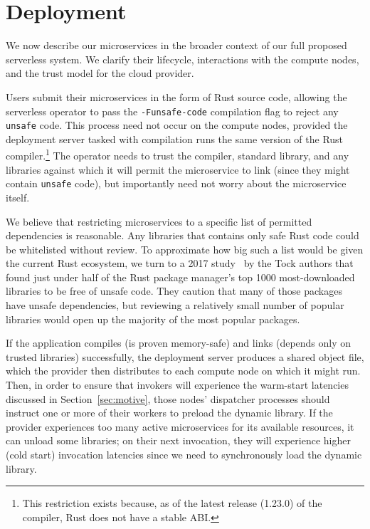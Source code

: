 \section{Deployment}
\label{sec:deploy}

We now describe our microservices in the broader context of our full proposed
serverless system.  We clarify their lifecycle, interactions with the compute nodes,
and the trust model for the cloud provider.

Users submit their microservices in the form of Rust source code, allowing the
serverless operator to pass the \texttt{-Funsafe-code} compilation flag to reject
any \texttt{unsafe} code.  This process need not occur on the compute
nodes, provided the deployment server tasked with compilation runs the same version
of the Rust compiler.\footnote{This restriction exists because, as of the latest
release (1.23.0) of the compiler, Rust does not have a stable ABI.}  The operator
needs to trust the compiler, standard library, and any libraries against which it
will permit the microservice to link (since they might contain \texttt{unsafe} code),
but importantly need not worry about the microservice itself.

We believe that restricting microservices to a specific
list of permitted dependencies is reasonable.  Any libraries that contains only
safe Rust code could be whitelisted without review.  To approximate how big such a
list would be given the current Rust ecosystem, we turn to a 2017
study~\cite{www-cratesio-unsafe} by the Tock authors that found just under half of
the Rust package manager's top 1000 most-downloaded libraries to be free of
unsafe code.  They caution that many of those packages have unsafe
dependencies, but reviewing a relatively small number of popular
libraries would open up the majority of the most popular packages.

If the application compiles (is proven memory-safe) and links (depends only on
trusted libraries) successfully, the deployment server produces a shared object file,
which the provider then distributes to each compute node on which it might run.
Then, in order to ensure that invokers will experience the warm-start latencies
discussed in Section~\ref{sec:motive}, those nodes' dispatcher processes should
instruct one or more of their workers to preload the dynamic library.  If the
provider experiences too many active microservices for its available resources, it
can unload some libraries; on their next invocation, they will experience higher
(cold start) invocation latencies since we need to synchronously load the dynamic
library.
